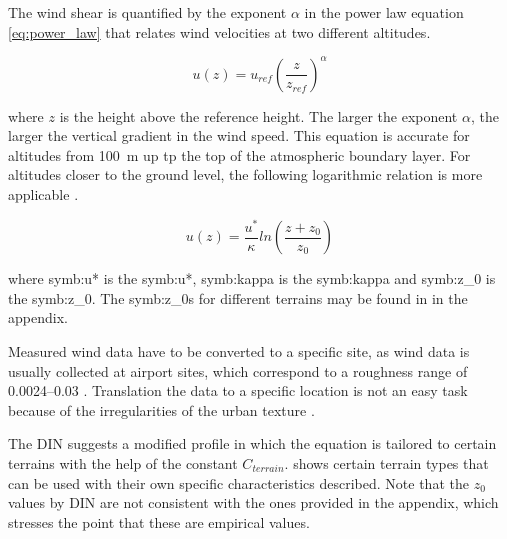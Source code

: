 The wind shear is quantified by the exponent $\alpha$ in the power law equation \ref{eq:power_law} that relates wind velocities at two different altitudes.

\begin{equation}
u(z)=u_{ref}\left( \frac{z}{z_{ref}}\right )^\alpha
\label{eq:power_law}
\end{equation}


where $z$ is the height above the reference height. The larger the exponent $\alpha$, the larger the vertical gradient in the wind speed. This equation is accurate for altitudes from \SI{100}{\metre} up tp the top of the atmospheric boundary layer. 
For altitudes closer to the ground level, the following logarithmic relation is more applicable \citep{Ghiaus2012,Hucho2011}.

\begin{equation}
u(z) = \frac{u^*}{\kappa} ln \left( \frac{z+z_0}{z_0}\right)
\end{equation}

where \gls{symb:u*} is the \glsdesc{symb:u*}, \gls{symb:kappa} is the \glsdesc{symb:kappa} and \gls{symb:z_0} is the \glsdesc{symb:z_0}. The \glsdesc{symb:z_0}s for different terrains may be found in   in the appendix.

Measured wind data have to be converted to a specific site, as wind data is usually collected at airport sites, which correspond to a roughness range of \SIrange{0.0024}{0.03}{} \cite{Ragheb2016}. Translation the data to a specific location is not an easy task because of the irregularities of the urban texture \citep{Ratti2002}.

The \gls{DIN} \citep{DIN10554-2005} suggests a modified profile in which the equation is tailored to certain terrains with the help of the constant $C_{terrain}$.  shows certain terrain types that can be used with their own specific characteristics described.
Note that the $z_0$ values by \gls{DIN} are not consistent with the ones provided in the appendix, which stresses the point that these are empirical values. 

